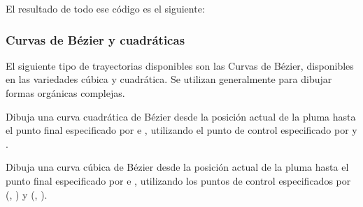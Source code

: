 El resultado de todo ese código es el siguiente:

\vspace{0.5cm} %
\begin{center}
\end{center}

\newpage %
\subsubsection{Curvas de Bézier y cuadráticas}

El siguiente tipo de trayectorias disponibles son las Curvas de Bézier, disponibles en las variedades cúbica y cuadrática. Se utilizan generalmente para dibujar formas orgánicas complejas.

\begin{description}
	 Dibuja una curva cuadrática de Bézier desde la posición actual de la pluma hasta el punto final especificado por  e , utilizando el punto de control especificado por  y .

	 Dibuja una curva cúbica de Bézier desde la posición actual de la pluma hasta el punto final especificado por  e , utilizando los puntos de control especificados por (, ) y (, ).
\end{description}
\vspace{0.5cm} %

